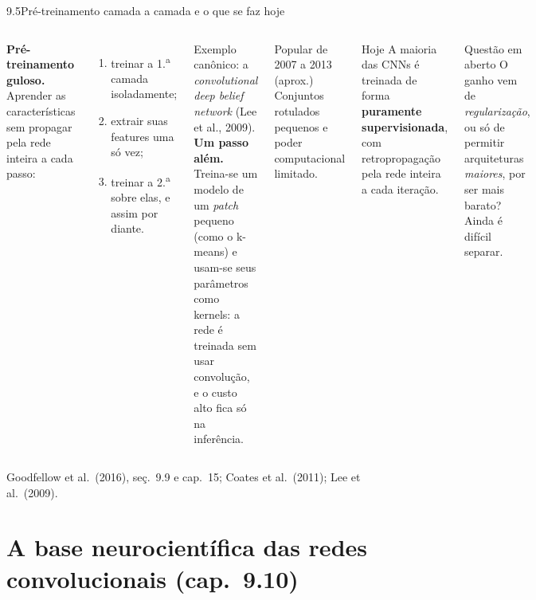 \documentclass[aspectratio=169,11pt]{beamer}
\begin{document}
\begin{frame}{9.5\enspace Pré-treinamento camada a camada e o que se faz hoje}
  \begin{columns}[T]
    \footnotesize
    \textbf{Pré-treinamento guloso.} Aprender as características sem propagar pela rede inteira a cada passo:
    \begin{enumerate}
      \item treinar a 1.\textsuperscript{a} camada isoladamente;
      \item extrair suas features uma só vez;
      \item treinar a 2.\textsuperscript{a} sobre elas, e assim por diante.
    \end{enumerate}
    Exemplo canônico: a \emph{convolutional deep belief network} (Lee et al., 2009).\\[0.3em]
    \textbf{Um passo além.} Treina-se um modelo de um \emph{patch} pequeno (como o k-means) e usam-se seus parâmetros como kernels:
    a rede é treinada \alert{sem usar convolução}, e o custo alto fica só na inferência.
    \footnotesize
    \begin{block}{Popular de 2007 a 2013 (aprox.)}
      Conjuntos rotulados pequenos e poder computacional limitado.
    \end{block}
    \begin{block}{Hoje}
      A maioria das CNNs é treinada de forma \textbf{puramente supervisionada}, com retropropagação pela rede inteira a cada iteração.
    \end{block}
    \begin{block}{Questão em aberto}
      O ganho vem de \emph{regularização}, ou só de permitir arquiteturas \emph{maiores}, por ser mais barato? Ainda é difícil separar.
    \end{block}
  \end{columns}
  {\scriptsize\textcolor{cinza}{Goodfellow et al.\ (2016), seç.~9.9 e cap.~15; Coates et al.\ (2011); Lee et al.\ (2009).}}
\end{frame}

\section[10.\enspace A base neurocientífica das redes convolucionais (cap.~9.10)]{A base neurocientífica das redes convolucionais \textcolor{cinza}{(cap.~9.10)}}
\end{document}
